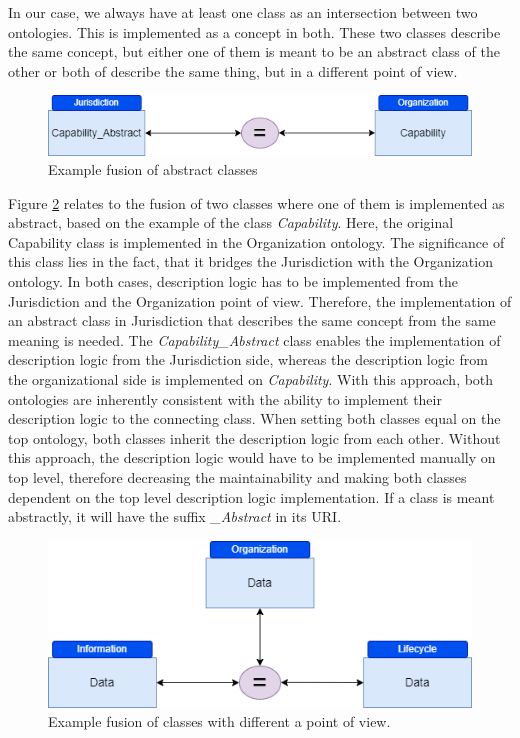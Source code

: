 \documentclass[
  a4paper,  %
  twoside,  %
  bibliography=totoc,
  headsepline,
  cleardoublepage=empty,
  parskip=half,
  draft=false
]{scrbook}
\begin{document}
In our case, we always have at least one class as an intersection between two ontologies. This is implemented as a concept in both. These two classes describe the same concept, but either one of them is meant to be an abstract class of the other or both of describe the same thing, but in a different point of view. \\

\begin{figure}
  \centering
  \includegraphics[width=\textwidth]{graphics/abstact_fusion.drawio.png}
  \caption{Example fusion of abstract classes}
  \label{fig:abstact_fusion}
\end{figure}

Figure \ref{fig:fusion_same} relates to the fusion of two classes where one of them is implemented as abstract, based on the example of the class \textit{Capability}. Here, the original Capability class is implemented in the Organization ontology. The significance of this class lies in the fact, that it bridges the Jurisdiction with the Organization ontology. In both cases, description logic has to be implemented from the Jurisdiction and the Organization point of view. Therefore, the implementation of an abstract class in Jurisdiction that describes the same concept from the same meaning is needed. The \textit{Capability\_Abstract} class enables the implementation of description logic from the Jurisdiction side, whereas the description logic from the organizational side is implemented on \textit{Capability}. With this approach, both ontologies are inherently consistent with the ability to implement their description logic to the connecting class. When setting both classes equal on the top ontology, both classes inherit the description logic from each other. Without this approach, the description logic would have to be implemented manually on top level, therefore decreasing the maintainability and making both classes dependent on the top level description logic implementation. If a class is meant abstractly, it will have the suffix \textit{\_Abstract} in its URI. \\


\begin{figure}
  \centering
  \includegraphics[width=\textwidth]{graphics/example_concept_fusion_same_meaning.drawio.png}
  \caption{Example fusion of classes with different a point of view.}
  \label{fig:fusion_same}
\end{figure}
\end{document}
